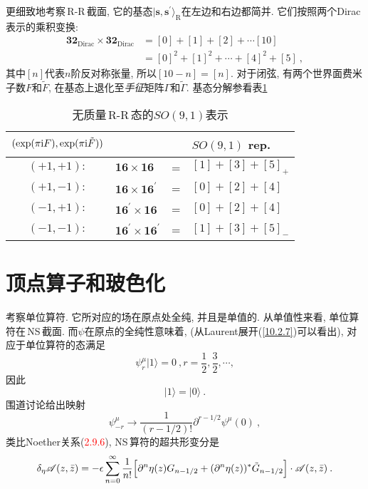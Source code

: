 更细致地考察\,R-R\,截面, 它的基态$ \lvert\mathbf{s},\mathbf{s}^{\prime}\rangle_{\text{R}} $在左边和右边都简并. 它们按照两个Dirac表示的乘积变换:
\begin{align}
    \mathbf{32}_{\text{Dirac}}\times \mathbf{32}_{\text{Dirac}}
    &=[0]+[1]+[2]+\cdots[10] \nonumber \\
    &=[0]^{2}+[1]^{2}+\cdots +[4]^{2}+[5] \:, \label{10.2.25}
\end{align}
其中$ [n] $代表$ n $阶反对称张量, 所以$ [10-n]=[n]$. 对于闭弦, 有两个世界面费米子数$ F $和$ \tilde{F}$, 在基态上退化至{\emph{手征}}矩阵$ \Gamma $和$ \tilde{\Gamma}$. 基态分解参看表\ref{tab:10.1}
\begin{table}[h]
\caption{无质量\,R-R\,态的$ SO(9,1) $表示}
\label{tab:10.1}%
\centering
\begin{tabular}[c]{clcl}
\hline\hline
 $\vphantom{\Big[}(\exp(\pi\mathrm{i} F),\exp(\pi\mathrm{i}\tilde{F}))$ & & &$SO(9,1)$ rep.  \\
\hline
$(+1,+1):$& $ \mathbf{16}\times\mathbf{16} $ & = &  $[1]+[3]+[5]_{+}$\\
$(+1,-1):$& $ \mathbf{16}\times\mathbf{16}^{\prime}$ & = &  $[0]+[2]+[4]$\\
$(-1,+1):$& $ \mathbf{16}^{\prime}\times\mathbf{16} $ & = &  $[0]+[2]+[4]$\\
$(-1,-1):$& $ \mathbf{16}^{\prime}\times\mathbf{16}^{\prime} $ & = &  $[1]+[3]+[5]_{-}$ \\
 \hline\hline
\end{tabular}
\end{table}

\section{顶点算子和玻色化}

考察单位算符. 它所对应的场在原点处全纯, 并且是单值的. 从单值性来看, 单位算符在\,NS\,截面. 而$\psi$在原点的全纯性意味着, (从Laurent展开(\ref{10.2.7})可以看出), 对应于单位算符的态满足
\begin{equation}
    \psi_{r}^{\mu} \lvert 1\rangle =0 \:, r=\frac{1}{2},\frac{3}{2},\cdots, \label{10.3.1}
\end{equation}
因此
\begin{equation}
    \lvert 1\rangle =\lvert 0\rangle \:. \label{10.3.2}
\end{equation}
围道讨论给出映射
\begin{equation}
    \psi_{-r}^{\mu} \to \frac{1}{(r-1/2)!}\partial^{r-1/2}\psi^{\mu}(0)\:, \label{10.3.3}
\end{equation}
类比Noether关系(\textcolor{red}{2.9.6}), NS\,算符的超共形变分是
\begin{equation}
    \delta_{\eta}\mathscr{A}(z,\bar{z})=-\epsilon \sum_{n=0}^{\infty}\frac{1}{n!}
    \Bigl[\partial^{n}\eta(z)G_{n-1/2}+(\partial^{n}\eta(z))^{\ast}\tilde{G}_{n-1/2}\Bigr]\cdot \mathscr{A}(z,\bar{z})\:. \label{10.3.4}
\end{equation}

